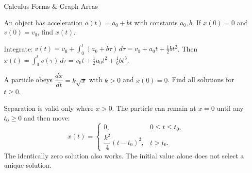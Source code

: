 \begin{KnowledgePoint}{Calculus Forms \& Graph Areas \Extension}
  \KPProblems
  \begin{cheatproblem}
  An object has acceleration $a(t)=a_0+bt$ with constants $a_0,b$. If $x(0)=0$ and $v(0)=v_0$, find $x(t)$.
  \begin{solutionbox}
  Integrate: $v(t)=v_0+\int_0^t(a_0+b\tau)\,d\tau=v_0+a_0 t+\tfrac12 b t^2$. Then $x(t)=\int_0^t v(\tau)\,d\tau=v_0 t+\tfrac12 a_0 t^2+\tfrac16 b t^3$.
  \end{solutionbox}
  \end{cheatproblem}

  \begin{cheatproblem}
  A particle obeys $\dfrac{dx}{dt}=k\sqrt{x}$ with $k>0$ and $x(0)=0$. Find all solutions for $t\ge0$.
  \begin{solutionbox}
  Separation is valid only where $x>0$. The particle can remain at $x=0$ until any $t_0\ge0$ and then move:
  \[
  x(t)=\begin{cases}0,&0\le t\le t_0,\\
  \dfrac{k^2}{4}(t-t_0)^2,&t>t_0.\end{cases}
  \]
  The identically zero solution also works. The initial value alone does not select a unique solution.
  \end{solutionbox}
  \end{cheatproblem}
\end{KnowledgePoint}



